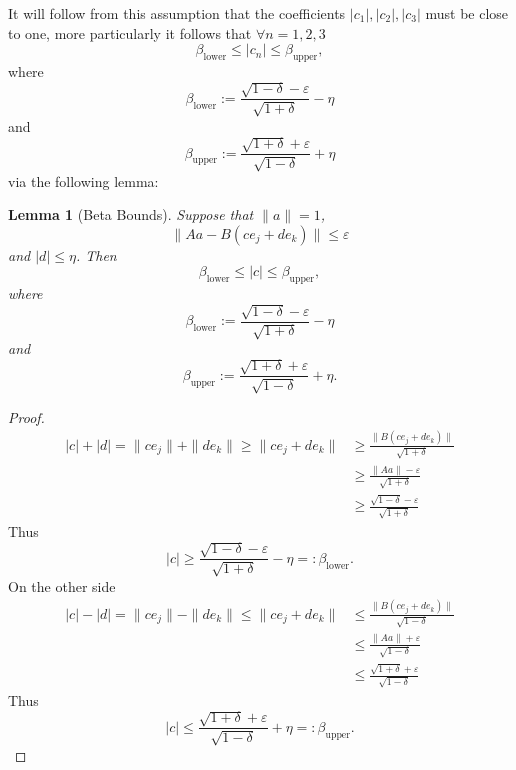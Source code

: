 \documentclass[11pt]{amsart}
\newtheorem{lemma}{Lemma}
\begin{document}
It will follow from this assumption that the
coefficients $|c_1|, |c_2|, |c_3|$ must be close to one, more particularly it follows that  $\forall n=1,2,3$
 \[\beta_\text{lower} \leq |c_n| \leq \beta_\text{upper},\]
where 
\[\beta_\text{lower}:= \frac{\sqrt{1-\delta}-\varepsilon}{\sqrt{1+\delta}} - \eta\] and
\[\beta_\text{upper}:= \frac{\sqrt{1+\delta}+\varepsilon}{\sqrt{1-\delta}} + \eta\]
via the following lemma:
\begin{lemma}[Beta Bounds]
Suppose that $\|a\|=1$,
\[\|Aa - B(ce_{j}+d e_{k})\|\leq \varepsilon \]   
and $|d|\leq \eta$.  Then 
 \[\beta_\text{lower} \leq |c| \leq \beta_\text{upper},\]
where 
\[\beta_\text{lower}:= \frac{\sqrt{1-\delta}-\varepsilon}{\sqrt{1+\delta}} - \eta\] and
\[\beta_\text{upper}:= \frac{\sqrt{1+\delta}+\varepsilon}{\sqrt{1-\delta}} + \eta.\]
\end{lemma}
\begin{proof}
\begin{align*}
|c|+|d|=\|ce_j\|+\|de_k\|\geq\|ce_j+de_k\|&\geq \frac{\|B(ce_j+de_k)\|}{\sqrt{1+\delta}}\\
&\geq \frac{\|Aa\|-\varepsilon}{\sqrt{1+\delta}} \\
&\geq \frac{\sqrt{1-\delta}-\varepsilon}{\sqrt{1+\delta}}
\end{align*}
Thus 
\[|c|\geq \frac{\sqrt{1-\delta}-\varepsilon}{\sqrt{1+\delta}} - \eta=:\beta_\text{lower}.\]
On the other side
\begin{align*}
|c|-|d|=\|ce_j\|-\|de_k\|\leq\|ce_j+de_k\|&\leq \frac{\|B(ce_j+de_k)\|}{\sqrt{1-\delta}}\\
&\leq \frac{\|Aa\|+\varepsilon}{\sqrt{1-\delta}} \\
&\leq \frac{\sqrt{1+\delta}+\varepsilon}{\sqrt{1-\delta}}
\end{align*}
Thus 
\[|c|\leq \frac{\sqrt{1+\delta}+\varepsilon}{\sqrt{1-\delta}} + \eta=:\beta_\text{upper}.\]
\end{proof}
\end{document}
